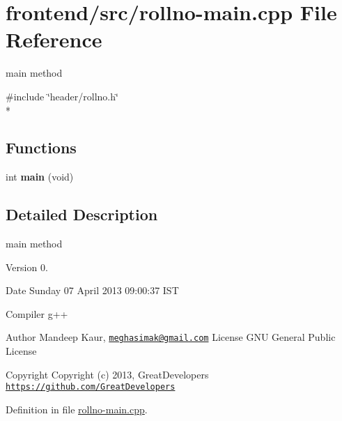 \hypertarget{rollno-main_8cpp}{\section{frontend/src/rollno-\/main.cpp File Reference}
\label{rollno-main_8cpp}
}


main method  


{\ttfamily \#include \char`\"{}header/rollno.\-h\char`\"{}}\\*
\subsection*{Functions}
\begin{DoxyCompactItemize}
\item 
\hypertarget{rollno-main_8cpp_a840291bc02cba5474a4cb46a9b9566fe}{int {\bfseries main} (void)}\label{rollno-main_8cpp_a840291bc02cba5474a4cb46a9b9566fe}

\end{DoxyCompactItemize}


\subsection{Detailed Description}
main method \begin{DoxyVersion}{Version}
0. 
\end{DoxyVersion}
\begin{DoxyDate}{Date}
Sunday 07 April 2013 09\-:00\-:37 I\-S\-T\par
Compiler g++
\end{DoxyDate}
\begin{DoxyAuthor}{Author}
Mandeep Kaur, \href{mailto:meghasimak@gmail.com}{\tt meghasimak@gmail.\-com} License G\-N\-U General Public License 
\end{DoxyAuthor}
\begin{DoxyCopyright}{Copyright}
Copyright (c) 2013, Great\-Developers \href{https://github.com/GreatDevelopers}{\tt https\-://github.\-com/\-Great\-Developers} 
\end{DoxyCopyright}


Definition in file \hyperlink{rollno-main_8cpp_source}{rollno-\/main.\-cpp}.

